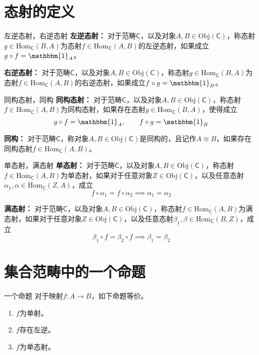 \documentclass{beamer}
\begin{document}
\section{态射的定义}

\begin{frame}{左逆态射，右逆态射}
	\textbf{左逆态射：}
	对于范畴$\mathsf{C}$，以及对象$A,B\in\mathrm{Obj}(\mathsf{C})$，称态射$g\in\mathrm{Hom}_\mathsf{C}(B,A)$为态射$f\in\mathrm{Hom}_\mathsf{C}(A,B)$的左逆态射，如果成立$g\circ f=\mathbbm{1}_A$。
	
	\textbf{右逆态射：}
	对于范畴$\mathsf{C}$，以及对象$A,B\in\mathrm{Obj}(\mathsf{C})$，称态射$g\in\mathrm{Hom}_\mathsf{C}(B,A)$为态射$f\in\mathrm{Hom}_\mathsf{C}(A,B)$的右逆态射，如果成立$f\circ g=\mathbbm{1}_B$。
\end{frame}

\begin{frame}{同构态射，同构}
	\textbf{同构态射：}
	对于范畴$\mathsf{C}$，以及对象$A,B\in\mathrm{Obj}(\mathsf{C})$，称态射$f\in\mathrm{Hom}_\mathsf{C}(A,B)$为同构态射，如果存在态射$g\in\mathrm{Hom}_\mathsf{C}(B,A)$，使得成立
	$$
	g\circ f=\mathbbm{1}_A,\qquad f\circ g=\mathbbm{1}_B
	$$
	
	\textbf{同构：}
	对于范畴$\mathsf{C}$，称对象$A,B\in\mathrm{Obj}(\mathsf{C})$是同构的，且记作$A\cong B$，如果存在同构态射$f\in\mathrm{Hom}_\mathsf{C}(A,B)$。
\end{frame}

\begin{frame}{单态射，满态射}
	\textbf{单态射：}
	对于范畴$\mathsf{C}$，以及对象$A,B\in\mathrm{Obj}(\mathsf{C})$，称态射$f\in\mathrm{Hom}_\mathsf{C}(A,B)$为单态射，如果对于任意对象$Z\in\mathrm{Obj}(\mathsf{C})$，以及任意态射$\alpha_1,\alpha\in\mathrm{Hom}_\mathsf{C}(Z,A)$，成立
	$$
	f\circ \alpha_1=f\circ \alpha_2
	\implies
	\alpha_1=\alpha_2
	$$
	
	\textbf{满态射：}
	对于范畴$\mathsf{C}$，以及对象$A,B\in\mathrm{Obj}(\mathsf{C})$，称态射$f\in\mathrm{Hom}_\mathsf{C}(A,B)$为满态射，如果对于任意对象$Z\in\mathrm{Obj}(\mathsf{C})$，以及任意态射$\beta_1,\beta\in\mathrm{Hom}_\mathsf{C}(B,Z)$，成立
	$$
	\beta_1\circ f=\beta_2\circ f
	\implies
	\beta_1=\beta_2
	$$
\end{frame}

\section{集合范畴中的一个命题}

\begin{frame}{一个命题}
	对于映射$f:A\to B$，如下命题等价。
	\begin{enumerate}
		\item $f$为单射。
		\item $f$存在左逆。
		\item $f$为单态射。
	\end{enumerate}
\end{frame}
\end{document}
